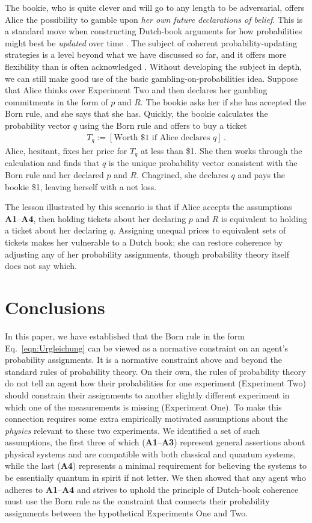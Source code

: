 \documentclass[%
 reprint,superscriptaddress,
 amsmath,amssymb,
 aps,twocolumn,pra
]{revtex4-1}
\newcommand{\eqn}[1]{\begin{eqnarray} #1 \end{eqnarray}}
\newcommand{\tit}[1]{\textit{#1}}
\newcommand{\trm}[1]{\textrm{#1}}
\newcommand{\onestage}{{One}}
\newcommand{\twostage}{{Two}}
\begin{document}
The bookie, who is quite clever and will go to any length to be adversarial, offers Alice the possibility to gamble upon \tit{her own future declarations of belief}. This is a standard move when constructing Dutch-book arguments for how probabilities might best be \tit{updated} over time \cite{VANF, FS_reflection}. The subject of coherent probability-updating strategies is a level beyond what we have discussed so far, and it offers more flexibility than is often acknowledged \cite{FS_reflection}. Without developing the subject in depth, we can still make good use of the basic gambling-on-probabilities idea. Suppose that Alice thinks over Experiment \twostage{} and then declares her gambling commitments in the form of $p$ and $R$. The bookie asks her if she has accepted the Born rule, and she says that she has. Quickly, the bookie calculates the probability vector $q$ using the Born rule and offers to buy a ticket
\eqn{
  T_q := [ \trm{Worth \$1 if Alice declares $q$} ] \, .
}
Alice, hesitant, fixes her price for $T_q$ at less than \$1. She then works through the calculation and finds that $q$ is the unique probability vector consistent with the Born rule and her declared $p$ and $R$. Chagrined, she declares $q$ and pays the bookie \$1, leaving herself with a net loss.

The lesson illustrated by this scenario is that if Alice accepts the assumptions {\bf A1}--{\bf A4}, then holding tickets about her declaring $p$ and $R$ is equivalent to holding a ticket about her declaring $q$. Assigning unequal prices to equivalent sets of tickets makes her vulnerable to a Dutch book; she can restore coherence by adjusting any of her probability assignments, though probability theory itself does not say which.

\section{Conclusions}

In this paper, we have established that the Born rule in the form Eq.\ \eqref{eqn:Urgleichung} can be viewed as a normative constraint on an agent's probability assignments. It is a normative constraint above and beyond the standard rules of probability theory. On their own, the rules of probability theory do not tell an agent how their probabilities for one experiment (Experiment \twostage) should constrain their assignments to another slightly different experiment in which one of the measurements is missing (Experiment \onestage). To make this connection requires some extra empirically motivated assumptions about the \tit{physics} relevant to these two experiments. We identified a set of such assumptions, the first three of which ({\bf A1}--{\bf A3}) represent general assertions about physical systems and are compatible with both classical and quantum systems, while the last ({\bf A4}) represents a minimal requirement for believing the systems to be essentially quantum in spirit if not letter. We then showed that any agent who adheres to {\bf A1}--{\bf A4} and strives to uphold the principle of Dutch-book coherence must use the Born rule as the constraint that connects their probability assignments between the hypothetical Experiments \onestage{} and \twostage.
\end{document}
